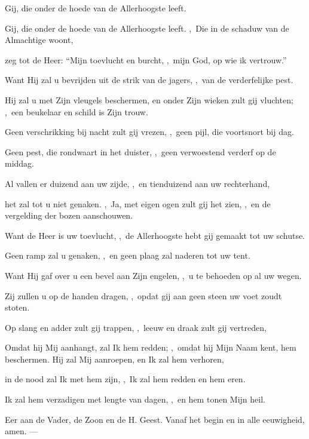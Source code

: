 \documentclass[12pt,twoside,a5paper]{article}
\begin{document}
\begin{halfparskip}
   Gij, die onder de hoede van de Allerhoogste leeft.


  Gij, die onder de hoede van de Allerhoogste leeft. \sep\ Die in de schaduw van de Almachtige woont,

  zeg tot de Heer: ``Mijn toevlucht en burcht, \sep\ mijn God, op wie ik vertrouw.''

  Want Hij zal u bevrijden uit de strik van de jagers, \sep\ van de verderfelijke pest.

  Hij zal u met Zijn vleugels beschermen, en onder Zijn wieken zult gij vluchten; \sep\ een beukelaar en schild is Zijn trouw.

  Geen verschrikking bij nacht zult gij vrezen, \sep\ geen pijl, die voortsnort bij dag.

  Geen pest, die rondwaart in het duister, \sep\ geen verwoestend verderf op de middag.

  Al vallen er duizend aan uw zijde, \sep\ en tienduizend aan uw rechterhand,

  het zal tot u niet genaken. \sep\ Ja, met eigen ogen zult gij het zien, \sep\ en de vergelding der bozen aanschouwen.

  Want de Heer is uw toevlucht, \sep\ de Allerhoogste hebt gij gemaakt tot uw schutse.

  Geen ramp zal u genaken, \sep\ en geen plaag zal naderen tot uw tent.

  Want Hij gaf over u een bevel aan Zijn engelen, \sep\ u te behoeden op al uw wegen.

  Zij zullen u op de handen dragen, \sep\ opdat gij aan geen steen uw voet zoudt stoten.

  Op slang en adder zult gij trappen, \sep\ leeuw en draak zult gij vertreden,

  Omdat hij Mij aanhangt, zal Ik hem redden; \sep\ omdat hij Mijn Naam kent, hem beschermen. Hij zal Mij aanroepen, en Ik zal hem verhoren,

  in de nood zal Ik met hem zijn, \sep\ Ik zal hem redden en hem eren.

  Ik zal hem verzadigen met lengte van dagen, \sep\ en hem tonen Mijn heil.

  Eer aan de Vader, de Zoon en de H. Geest. Vanaf het begin en in alle eeuwigheid, amen. --- 
\end{halfparskip}
\end{document}
